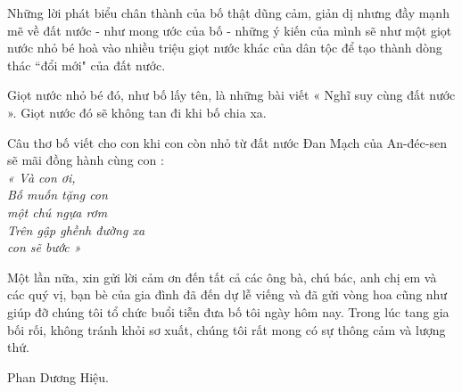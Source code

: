 Những lời phát biểu chân thành của bố thật dũng cảm, giản dị nhưng đầy mạnh mẽ về đất nước - như mong ước của bố - những ý kiến của mình sẽ như một giọt nước nhỏ bé hoà vào nhiều triệu giọt nước khác của dân tộc để tạo thành dòng thác “đổi mới" của đất nước.

Giọt nước nhỏ bé đó, như bố lấy tên, là những bài viết « Nghĩ suy cùng đất nước ». Giọt nước đó sẽ không tan đi khi bố chia xa.

Câu thơ bố viết cho con khi con còn nhỏ từ đất nước Đan Mạch của An-đéc-sen sẽ mãi đồng hành cùng con :\\
{\em 
« Và con ơi,\\
Bố muốn tặng con\\
một chú ngựa rơm\\
Trên gập ghềnh đường xa\\ 
con sẽ bước »\\
}

Một lần nữa, xin gửi lời cảm ơn đến tất cả các ông bà, chú bác, anh chị em và các quý vị, bạn bè của gia đình đã đến dự lễ viếng và đã gửi vòng hoa cũng như giúp đỡ chúng tôi tổ chức buổi tiễn đưa bố tôi ngày hôm nay. Trong lúc tang gia bối rối, không tránh khỏi sơ xuất, chúng tôi rất mong có sự thông cảm và lượng thứ.

Phan Dương Hiệu.

